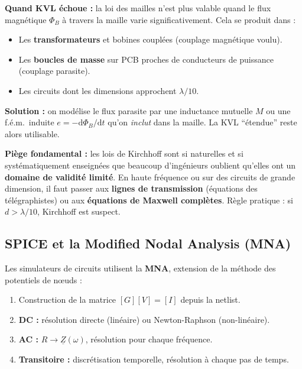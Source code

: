 \documentclass[12pt,a4paper,twoside]{book}
\begin{document}
\begin{attention}
\textbf{Quand KVL échoue :} la loi des mailles n'est plus valable quand le flux magnétique $\Phi_B$ à travers la maille varie significativement. Cela se produit dans :
\begin{itemize}[nosep]
\item Les \textbf{transformateurs} et bobines couplées (couplage magnétique voulu).
\item Les \textbf{boucles de masse} sur PCB proches de conducteurs de puissance (couplage parasite).
\item Les circuits dont les dimensions approchent $\lambda/10$.
\end{itemize}
\textbf{Solution :} on modélise le flux parasite par une inductance mutuelle $M$ ou une f.é.m.\ induite $e = -\mathrm{d}\Phi_B/\mathrm{d}t$ qu'on \textit{inclut} dans la maille. La KVL ``étendue'' reste alors utilisable.
\end{attention}

\begin{attention}
\textbf{Piège fondamental :} les lois de Kirchhoff sont si naturelles et si systématiquement enseignées que beaucoup d'ingénieurs oublient qu'elles ont un \textbf{domaine de validité limité}. En haute fréquence ou sur des circuits de grande dimension, il faut passer aux \textbf{lignes de transmission} (équations des télégraphistes) ou aux \textbf{équations de Maxwell complètes}. Règle pratique : si $d > \lambda/10$, Kirchhoff est suspect.
\end{attention}

\subsection{SPICE et la Modified Nodal Analysis (MNA)}

Les simulateurs de circuits utilisent la \textbf{MNA}, extension de la méthode des potentiels de n\oe uds :

\begin{enumerate}[nosep]
\item Construction de la matrice $[G][V] = [I]$ depuis la netlist.
\item \textbf{DC :} résolution directe (linéaire) ou Newton-Raphson (non-linéaire).
\item \textbf{AC :} $R \to \underline{Z}(\omega)$, résolution pour chaque fréquence.
\item \textbf{Transitoire :} discrétisation temporelle, résolution à chaque pas de temps.
\end{enumerate}
\end{document}
